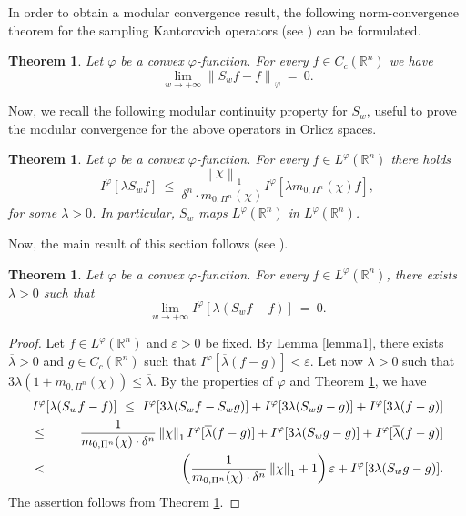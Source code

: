 \documentclass[11pt,a4paper]{article}
\newcommand{\miu}{\leq}
\newcommand{\ep}{\varepsilon}
\newcommand{\R}{\mathbb{R}}
\newtheorem{theorem}[definition]{Theorem}
\begin{document}
  In order to obtain a modular convergence result, the following norm-convergence theorem for the sampling Kantorovich operators (see \cite{COVI}) can be formulated.
\begin{theorem} \label{norm_conv} 
Let $\varphi$ be a convex $\varphi$-function. For every $f \in C_c(\R^n)$ we have
$$
\lim_{w \to +\infty} \left\|S_w f - f \right\|_{\varphi}\ =\ 0.
$$
\end{theorem}
Now, we recall the following modular continuity property for $S_w$, useful to prove the modular convergence for the above operators in Orlicz spaces.
\begin{theorem} \label{mod_cont} 
Let $\varphi$ be a convex $\varphi$-function. For every $f \in L^{\varphi}(\R^n)$ there holds
$$
I^{\varphi}[\lambda S_w f]\ \miu\ \frac{\left\|\chi\right\|_1}{\delta^n\cdot m_{0,\Pi^n}(\chi)}I^{\varphi}[\lambda m_{0,\Pi^n}(\chi)f],
$$
for some $\lambda>0$. In particular, $S_w$ maps $L^{\varphi}(\R^n)$ in $L^{\varphi}(\R^n)$.
\end{theorem}
%
\noindent Now, the main result of this section follows (see \cite{COVI}).
%
\begin{theorem} \label{th2}
Let $\varphi$ be a convex $\varphi$-function. For every $f \in L^{\varphi}(\R^n)$, there exists $\lambda>0$ such that
$$
\lim_{w \to +\infty} I^{\varphi}[\lambda (S_w f-f)]\ =\ 0.
$$
\end{theorem}
\begin{proof}
Let $f \in L^{\varphi}(\R^n)$ and $\ep>0$ be fixed. By Lemma \ref{lemma1}, there exists $\overline{\lambda}>0$ and $g \in C_c(\R^n)$ such that $I^{\varphi}[\overline{\lambda} (f-g)]\!<\! \ep$. Let now $\lambda>0$ such that $3\lambda(1 + m_{0,\Pi^n}(\chi)) \miu \overline{\lambda}$. By the properties of $\varphi$ and Theorem \ref{mod_cont}, we have
\begin{eqnarray*}
&& \hskip-0.7cm I^{\varphi}[\lambda(S_w f-f)]\ \miu\ I^{\varphi}[3\lambda(S_w f - S_w g)]+I^{\varphi}[3\lambda(S_w g - g)] + I^{\varphi}[3\lambda(f-g)]\\
&\miu&\ \frac{1}{m_{0,\Pi^n}(\chi)\cdot \delta^n}\left\|\chi \right\|_1 I^{\varphi}[\overline{\lambda} (f-g)] + I^{\varphi}[3\lambda(S_w g - g)] + I^{\varphi}[\overline{\lambda} (f-g)] \\
&<&\ \left(\frac{1}{m_{0,\Pi^n}(\chi) \cdot \delta^n}\left\|\chi \right\|_1+1\right) \ep + I^{\varphi}[3\lambda(S_w g - g)].
\end{eqnarray*}
The assertion follows from Theorem \ref{norm_conv}.
\end{proof} 
\end{document}
